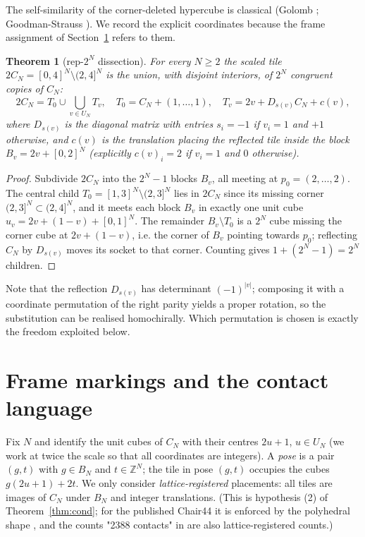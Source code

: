 \documentclass[11pt,a4paper]{article}
\theoremstyle{plain}
\newtheorem{theorem}{Theorem}[section]
\theoremstyle{definition}
\begin{document}
The self-similarity of the corner-deleted hypercube is classical (Golomb \cite{golomb}; Goodman-Strauss \cite{gs99,gs2026}). We record the explicit coordinates because the frame assignment of Section~\ref{sec:frames} refers to them.

\begin{theorem}[rep-$2^N$ dissection]
For every $N \ge  2$ the scaled tile $2C_N = [0,4]^N \setminus (2,4]^N$ is the union, with disjoint interiors, of $2^N$ congruent copies of $C_N$:
\[2C_N = T_0 \cup \bigcup_{v \in U_N} T_v, \quad T_0 = C_N + (1,\dots,1), \quad T_v = 2v + D_{s(v)} C_N + c(v),\]
where $D_{s(v)}$ is the diagonal matrix with entries $s_i = -1$ if $v_i = 1$ and $+1$ otherwise, and $c(v)$ is the translation placing the reflected tile inside the block $B_v = 2v + [0,2]^N$ (explicitly $c(v)_i = 2$ if $v_i = 1$ and $0$ otherwise).
\end{theorem}

\begin{proof}
Subdivide $2C_N$ into the $2^N - 1$ blocks $B_v$, all meeting at $p_0 = (2,\dots,2)$. The central child $T_0 = [1,3]^N \setminus (2,3]^N$ lies in $2C_N$ since its missing corner $(2,3]^N \subset (2,4]^N$, and it meets each block $B_v$ in exactly one unit cube $u_v = 2v + (1-v) + [0,1]^N$. The remainder $B_v \setminus T_0$ is a $2^N$ cube missing the corner cube at $2v + (1-v)$, i.e. the corner of $B_v$ pointing towards $p_0$; reflecting $C_N$ by $D_{s(v)}$ moves its socket to that corner. Counting gives $1 + (2^N - 1) = 2^N$ children.
\end{proof}


Note that the reflection $D_{s(v)}$ has determinant $(-1)^{|v|}$; composing it with a coordinate permutation of the right parity yields a proper rotation, so the substitution can be realised homochirally. Which permutation is chosen is exactly the freedom exploited below.

\section{Frame markings and the contact language}\label{sec:frames}

Fix $N$ and identify the unit cubes of $C_N$ with their centres $2u + 1$, $u \in U_N$ (we work at twice the scale so that all coordinates are integers). A \emph{pose} is a pair $(g, t)$ with $g \in B_N$ and $t \in \mathbb{Z}^N$; the tile in pose $(g,t)$ occupies the cubes $g(2u+1) + 2t$. We only consider \emph{lattice-registered} placements: all tiles are images of $C_N$ under $B_N$ and integer translations. (This is hypothesis (2) of Theorem~\ref{thm:cond}; for the published Chair44 it is enforced by the polyhedral shape \cite{tsiokos,flicker}, and the counts "2388 contacts" in \cite{flicker} are also lattice-registered counts.)
\end{document}
